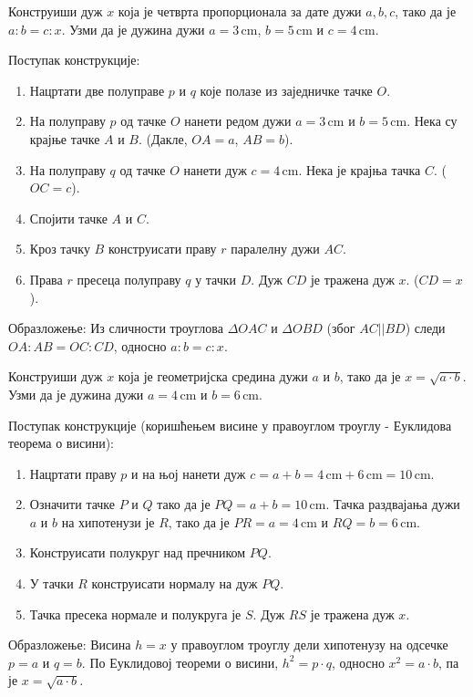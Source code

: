 \documentclass[10pt,a5paper,addpoints,answers]{exam}
\def\measure#1#2{#1 \, \mathrm{#2}}
\begin{document}
\begin{questions}
\question[3]
 Конструиши дуж $x$ која је четврта пропорционала за дате дужи $a, b, c$, тако да је $a:b=c:x$. Узми да је дужина дужи $a=\measure{3}{cm}$, $b=\measure{5}{cm}$ и $c=\measure{4}{cm}$.
 \begin{solution}[\stretch 7] %
  Поступак конструкције:
  \begin{enumerate}
      \item Нацртати две полуправе $p$ и $q$ које полазе из заједничке тачке $O$.
      \item На полуправу $p$ од тачке $O$ нанети редом дужи $a=\measure{3}{cm}$ и $b=\measure{5}{cm}$. Нека су крајње тачке $A$ и $B$. (Дакле, $OA=a$, $AB=b$).
      \item На полуправу $q$ од тачке $O$ нанети дуж $c=\measure{4}{cm}$. Нека је крајња тачка $C$. ($OC=c$).
      \item Спојити тачке $A$ и $C$.
      \item Кроз тачку $B$ конструисати праву $r$ паралелну дужи $AC$.
      \item Права $r$ пресеца полуправу $q$ у тачки $D$. Дуж $CD$ је тражена дуж $x$. ($CD=x$).
  \end{enumerate}
  Образложење: Из сличности троуглова $\Delta OAC$ и $\Delta OBD$ (због $AC || BD$) следи $OA:AB = OC:CD$, односно $a:b=c:x$.
 \end{solution}
 \answerline

\ifprintanswers\else\newpage\fi %

\question[3]
 Конструиши дуж $x$ која је геометријска средина дужи $a$ и $b$, тако да је $x = \sqrt{a \cdot b}$. Узми да је дужина дужи $a=\measure{4}{cm}$ и $b=\measure{6}{cm}$.
 \begin{solution}[\stretch 7] %
  Поступак конструкције (коришћењем висине у правоуглом троуглу - Еуклидова теорема о висини):
  \begin{enumerate}
      \item Нацртати праву $p$ и на њој нанети дуж $c = a+b = 4\,\mathrm{cm} + 6\,\mathrm{cm} = 10\,\mathrm{cm}$.
      \item Означити тачке $P$ и $Q$ тако да је $PQ = a+b = 10\,\mathrm{cm}$. Тачка раздвајања дужи $a$ и $b$ на хипотенузи је $R$, тако да је $PR = a = 4\,\mathrm{cm}$ и $RQ = b = 6\,\mathrm{cm}$.
      \item Конструисати полукруг над пречником $PQ$.
      \item У тачки $R$ конструисати нормалу на дуж $PQ$.
      \item Тачка пресека нормале и полукруга је $S$. Дуж $RS$ је тражена дуж $x$.
  \end{enumerate}
  Образложење: Висина $h=x$ у правоуглом троуглу дели хипотенузу на одсечке $p=a$ и $q=b$. По Еуклидовој теореми о висини, $h^2 = p \cdot q$, односно $x^2 = a \cdot b$, па је $x = \sqrt{a \cdot b}$.
 \end{solution}
 \answerline


\end{questions}
\end{document}
